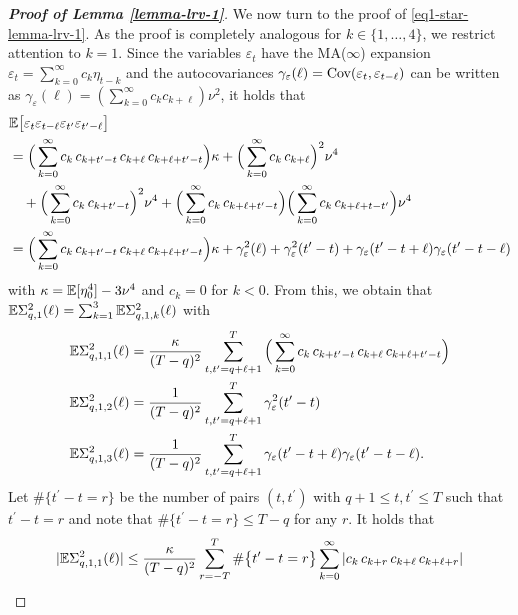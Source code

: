 \begin{proof}[\textnormal{\textbf{Proof of Lemma \ref{lemma-lrv-1}}}]
We now turn to the proof of \eqref{eq1-star-lemma-lrv-1}. As the proof is completely analogous for $k \in \{1,\ldots,4\}$, we restrict attention to $k=1$. Since the variables $\varepsilon_t$ have the MA($\infty$) expansion $\varepsilon_t = \sum_{k=0}^{\infty} c_k \eta_{t-k}$ and the autocovariances $\gamma_\varepsilon(\ell) = \textnormal{Cov}(\varepsilon_t,\varepsilon_{t-\ell})$ can be written as $\gamma_\varepsilon(\ell) = (\sum_{k=0}^\infty c_k c_{k+\ell}) \nu^2$, it holds that 
\begin{align*} 
 & \mathbb{E} \big[ \varepsilon_{t} \varepsilon_{t-\ell} \varepsilon_{t^\prime} \varepsilon_{t^\prime-\ell} \big] \\*
 & = \Big( \sum_{k=0}^{\infty} c_k \, c_{k+t^\prime-t} \, c_{k+\ell} \, c_{k+\ell+t^\prime-t} \Big) \kappa +  \Big( \sum_{k=0}^{\infty} c_k \, c_{k+\ell} \Big)^2 \nu^4 \\*
 & \quad + \Big( \sum_{k=0}^{\infty} c_k \, c_{k+t^\prime-t} \Big)^2 \nu^4 + \Big( \sum_{k=0}^{\infty} c_k \, c_{k+\ell+t^\prime-t} \Big) \Big( \sum_{k=0}^{\infty} c_k \, c_{k+\ell+t-t^\prime} \Big) \nu^4 \\*
 & = \Big( \sum_{k=0}^{\infty} c_k \, c_{k+t^\prime-t} \, c_{k+\ell} \, c_{k+\ell+t^\prime-t} \Big) \kappa + \gamma_\varepsilon^2(\ell) + \gamma_\varepsilon^2(t^\prime-t) + \gamma_\varepsilon(t^\prime-t+\ell) \gamma_\varepsilon(t^\prime-t-\ell)
\end{align*}
with $\kappa=\mathbb{E}[\eta_0^4] - 3 \nu^4$ and $c_k=0$ for $k < 0$. From this, we obtain that $\mathbb{E} \Sigma_{q,1}^2(\ell) = \sum_{k=1}^3 \mathbb{E} \Sigma_{q,1,k}^2(\ell)$ with  
\begin{align*}
\mathbb{E} \Sigma_{q,1,1}^2(\ell) & = \frac{\kappa}{(T-q)^2} \sum_{t,t^\prime=q+\ell+1}^T \Big( \sum_{k=0}^{\infty} c_k \, c_{k+t^\prime-t} \, c_{k+\ell} \, c_{k+\ell+t^\prime-t} \Big) \\
\mathbb{E} \Sigma_{q,1,2}^2(\ell) & = \frac{1}{(T-q)^2} \sum_{t,t^\prime=q+\ell+1}^T \gamma_{\varepsilon}^2(t^\prime-t) \\
\mathbb{E} \Sigma_{q,1,3}^2(\ell) & = \frac{1}{(T-q)^2} \sum_{t,t^\prime=q+\ell+1}^T \gamma_{\varepsilon}(t^\prime-t+\ell) \gamma_{\varepsilon}(t^\prime-t-\ell). 
\end{align*}
Let $\# \{ t^\prime - t = r \}$ be the number of pairs $(t,t^\prime)$ with $q+1 \le t,t^\prime \le T$ such that $t^\prime - t = r$ and note that $\# \{ t^\prime - t = r \} \le T-q$ for any $r$. It holds that 
\begin{align}
|\ex \Sigma_{q,1,1}^2(\ell)| & \le \frac{\kappa}{(T-q)^2} \sum_{r=-T}^T \# \big\{ t^\prime - t = r \big\} \sum_{k=0}^{\infty} | c_k \, c_{k+r} \, c_{k+\ell} \, c_{k+\ell+r} | \nonumber \\

\end{align}
\end{proof}
